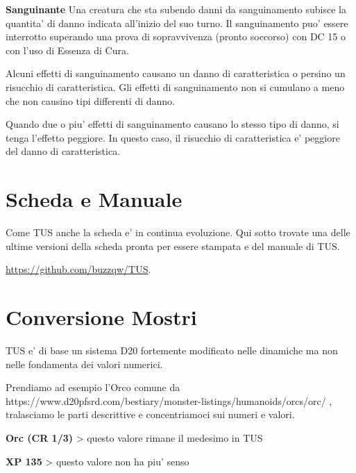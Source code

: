 \documentclass[a4paper,11pt,twoside,openany]{book}
\begin{document}
{		\textbf{Sanguinante} Una creatura che sta subendo danni da sanguinamento subisce la quantita' di danno indicata all'inizio del suo turno. Il sanguinamento puo' essere interrotto superando una prova di sopravvivenza (pronto soccorso) con DC 15 o con l'uso di Essenza di Cura.
		
		Alcuni effetti di sanguinamento causano un danno di caratteristica o persino un risucchio di caratteristica. Gli effetti di sanguinamento non si cumulano a meno che non causino tipi differenti di danno.
		
		Quando due o piu' effetti di sanguinamento causano lo stesso tipo di danno, si tenga l'effetto peggiore. In questo caso, il risucchio di caratteristica e' peggiore del danno di caratteristica.
		
		\pagebreak
		
		\section{Scheda e Manuale}
		
		\label{scheda-e-manuale}
		
		Come TUS anche la scheda e' in continua evoluzione. Qui sotto trovate una delle ultime versioni della scheda pronta per essere stampata e del manuale di TUS. 
		
		\url{https://github.com/buzzqw/TUS}.
		
		
		
		
		
		\pagebreak
		
		\section*{Conversione Mostri}
		
		\bigskip
		
		TUS e' di base un sistema D20 fortemente modificato nelle dinamiche ma non nelle fondamenta dei valori numerici.
		
		Prendiamo ad esempio l'Orco comune da https://www.d20pfsrd.com/bestiary/monster-listings/humanoids/orcs/orc/ , tralasciamo le parti descrittive e concentriamoci sui numeri e valori.
		
		\bigskip
		
		\textbf{Orc (CR 1/3)} \textgreater{} questo valore rimane il medesimo in TUS
		
		\textbf{XP 135} \textgreater{} questo valore non ha piu' senso 
		
}
\end{document}
